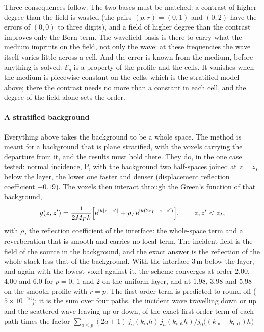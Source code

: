 \documentclass[preprint,review,12pt]{elsarticle}
\begin{document}
Three consequences follow. The two bases must be matched: a contrast of higher degree than the field is
wasted (the pairs $(p,r)=(0,1)$ and $(0,2)$ have the errors of $(0,0)$ to three digits), and a field of
higher degree than the contrast improves only the Born term. The wavefield basis is there to carry what
the medium imprints on the field, not only the wave: at these frequencies the wave itself varies little
across a cell. And the error is known from the medium, before anything is solved: $\mathcal{E}_q$ is a
property of the profile and the cells. It vanishes when the medium is piecewise constant on the cells,
which is the stratified model above; there the contrast needs no more than a constant in each cell, and
the degree of the field alone sets the order.

\paragraph{A stratified background} Everything above takes the background to be a whole space. The
method is meant for a background that is plane stratified, with the voxels carrying the departure from
it, and the results must hold there. They do, in the one case tested: normal incidence, P, with the
background two half-spaces joined at $z=z_I$ below the layer, the lower one faster and denser
(displacement reflection coefficient $-0.19$). The voxels then interact through the Green's function
of that background,
\begin{equation}\label{eq:gstrat}
  g(z,z')=\frac{\mathrm{i}}{2M_Pk}\Bigl[\mathrm{e}^{\mathrm{i}k|z-z'|}
          +\rho_I\,\mathrm{e}^{\mathrm{i}k(2z_I-z-z')}\Bigr],\qquad z,z'<z_I,
\end{equation}
with $\rho_I$ the reflection coefficient of the interface: the whole-space term and a reverberation
that is smooth and carries no local term. The incident field is the field of the source in the
background, and the exact answer is the reflection of the whole stack less that of the background.
With the interface $3$\,m below the layer, and again with the lowest voxel against it, the scheme
converges at order $2.00$, $4.00$ and $6.0$ for $p=0$, $1$ and $2$ on the uniform layer, and at
$1.98$, $3.98$ and $5.98$ on the smooth profile with $r=p$. The first-order term is predicted to
round-off ($5\times10^{-16}$): it is the sum over four paths, the incident wave travelling down or up
and the scattered wave leaving up or down, of the exact first-order term of each path times the factor
$\sum_{a\le p}(2a+1)\,j_a(k_{\mathrm{in}}h)\,j_a(k_{\mathrm{out}}h)/j_0\bigl((k_{\mathrm{in}}-k_{\mathrm{out}})h\bigr)$
\end{document}
